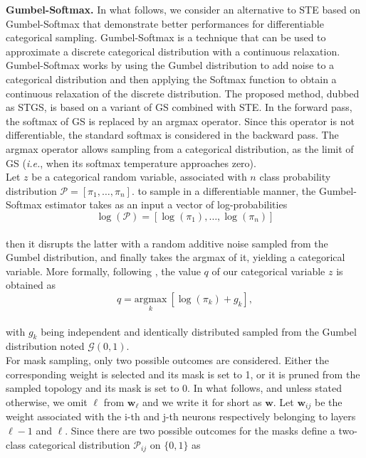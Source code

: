 \noindent\textbf{Gumbel-Softmax.} In what follows, we consider an alternative to
\ac{STE} based on Gumbel-Softmax \cite{DBLP:conf/iclr/JangGP17} that demonstrate
better performances for differentiable categorical sampling. Gumbel-Softmax is a
technique that can be used to approximate a discrete categorical distribution
with a continuous relaxation. Gumbel-Softmax works by using the Gumbel
distribution to add noise to a categorical distribution and then applying the
Softmax function to obtain a continuous relaxation of the discrete distribution.
The proposed method, dubbed as \ac{STGS}, is based on a variant of \ac{GS}
combined with \ac{STE}. In the forward pass, the softmax of \ac{GS} is replaced
by an argmax operator. Since this operator is not differentiable, the standard
softmax is considered in the backward pass. The argmax operator allows sampling
from a categorical distribution, as the limit of \ac{GS} (\emph{i.e.}, when its
softmax temperature approaches zero). \\

Let $z$ be a categorical random variable, associated with $n$ class probability
distribution $\mathcal{P} = [\pi_1,\dots,\pi_n]$. to sample in a
differentiable manner, the Gumbel-Softmax estimator takes as an input a vector
of log-probabilities \\

\begin{equation}
  \label{eqn:chap2:gumbel-softmax-input}
  \log(\mathcal{P}) =[\log(\pi_1),\dots, \log(\pi_n)] 
\end{equation}\\

then it disrupts the latter with a random additive noise sampled from the Gumbel
distribution, and finally takes the argmax of it, yielding a categorical
variable. More formally, following \cite{DBLP:conf/iclr/JangGP17}, the value $q$
of our categorical variable $z$ is obtained as \\

\begin{equation}
  \label{eqn:chap2:gumbel-softmax-argmax}
  q = \underset{k}{ \text{argmax}} \ [ \log(\pi_k)+g_k ],
\end{equation}\\

with $g_k$ being independent and identically distributed sampled from  the
Gumbel distribution noted $\mathcal{G}(0,1)$.\\

For mask sampling, only two possible outcomes are considered. Either the
corresponding weight is selected and its mask is set to 1, or it is pruned
from the sampled topology and its mask is set to 0. In what follows, and
unless stated otherwise, we omit $\ell$ from $\bm{w}_\ell$ and we write it for
short as $\bm{w}$. Let $\bm{w}_{ij}$ be the weight associated with the i-th and
j-th neurons respectively belonging to layers $\ell-1$ and $\ell$. Since there
are two possible outcomes for the masks define a two-class categorical distribution
$\mathcal{P}_{ij}$ on $\{0,1\}$ as\\

